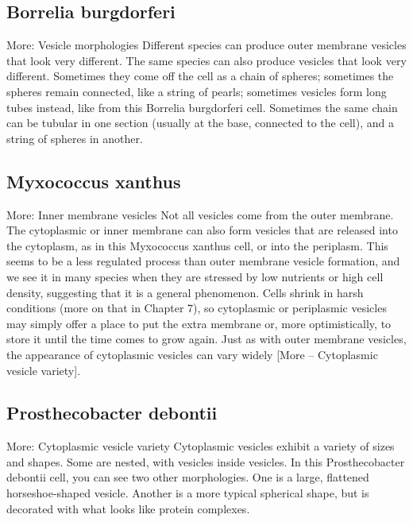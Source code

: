 \documentclass[]{book}
\begin{document}
\subsection{Borrelia burgdorferi}\label{borrelia-burgdorferi-1}

More: Vesicle morphologies Different species can produce outer membrane
vesicles that look very different. The same species can also produce
vesicles that look very different. Sometimes they come off the cell as a
chain of spheres; sometimes the spheres remain connected, like a string
of pearls; sometimes vesicles form long tubes instead, like from this
Borrelia burgdorferi cell. Sometimes the same chain can be tubular in
one section (usually at the base, connected to the cell), and a string
of spheres in another.

\subsection{Myxococcus xanthus}\label{myxococcus-xanthus}

More: Inner membrane vesicles Not all vesicles come from the outer
membrane. The cytoplasmic or inner membrane can also form vesicles that
are released into the cytoplasm, as in this Myxococcus xanthus cell, or
into the periplasm. This seems to be a less regulated process than outer
membrane vesicle formation, and we see it in many species when they are
stressed by low nutrients or high cell density, suggesting that it is a
general phenomenon. Cells shrink in harsh conditions (more on that in
Chapter 7), so cytoplasmic or periplasmic vesicles may simply offer a
place to put the extra membrane or, more optimistically, to store it
until the time comes to grow again. Just as with outer membrane
vesicles, the appearance of cytoplasmic vesicles can vary widely {[}More
-- Cytoplasmic vesicle variety{]}.

\subsection{Prosthecobacter debontii}\label{prosthecobacter-debontii}

More: Cytoplasmic vesicle variety Cytoplasmic vesicles exhibit a variety
of sizes and shapes. Some are nested, with vesicles inside vesicles. In
this Prosthecobacter debontii cell, you can see two other morphologies.
One is a large, flattened horseshoe-shaped vesicle. Another is a more
typical spherical shape, but is decorated with what looks like protein
complexes.
\end{document}
